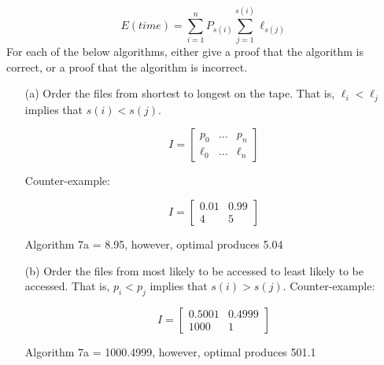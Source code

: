 \documentclass[10pt]{article}
\begin{document}
	\[E(time) = \sum\limits_{i=1}^n P_{s(i)} \sum\limits_{j=1}^{s(i)} \ell_{s(j)}\]
	\noindent
	For each of the below algorithms, either give a proof that the algorithm is correct, or a proof that the
	algorithm is incorrect.
	\begin{enumerate}
		\item[(a)] Order the files from shortest to longest on the tape. That is, $\ell_{i} < \ell_{j}$ implies that $s(i) < s(j)$.
		
	\[ I = \left[
		\begin{array}{ccc}
		p_{0} & \ldots & p_{n}\\ 
		\ell_{0} & \ldots & \ell_{n}
		\end{array}
	 \right]\]
	 
	 Counter-example: 
	 
	\[ I = \left[
		\begin{array}{cc}
		0.01 &  0.99\\ 
		4 & 5 
		\end{array}
	 \right]\]
	 
	 Algorithm 7a = 8.95, however, optimal produces 5.04
	 
		\item[(b)] Order the files from most likely to be accessed to least likely to be accessed.  That is, $p_{i} < p_{j}$
		implies that $s(i) > s(j)$.
	 Counter-example: 
	 
	\[ I = \left[
		\begin{array}{cc}
		0.5001 &  0.4999\\ 
		1000 & 1 
		\end{array}
	 \right]\]
	 	
	 	Algorithm 7a = 1000.4999, however, optimal produces 501.1
	 		

\end{enumerate}
\end{document}
